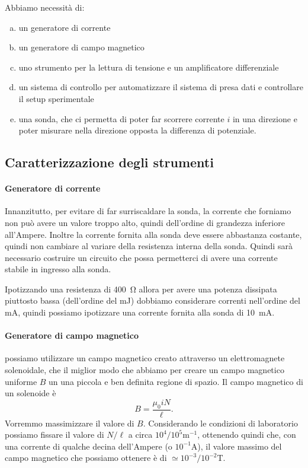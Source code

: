 \documentclass[fleqn,varvw,11pt,tightenlines]{memo}
\begin{document}
Abbiamo necessità di:\begin{enumerate}[a.]
    \item un generatore di corrente
    \item un generatore di campo magnetico
    \item uno strumento per la lettura di tensione e un amplificatore differenziale
    \item un sistema di controllo per automatizzare il sistema di presa dati e controllare il setup sperimentale
    \item una sonda, che ci permetta di poter far scorrere corrente $i$ in una direzione e poter misurare nella direzione opposta la differenza di potenziale.
\end{enumerate}

\subsection{Caratterizzazione degli strumenti}
\paragraph{Generatore di corrente} Innanzitutto, per evitare di far surriscaldare la sonda, la corrente che forniamo non può avere un valore troppo alto, quindi dell'ordine di grandezza inferiore all'Ampere. Inoltre la corrente fornita alla sonda deve essere abbastanza costante, quindi non cambiare al variare della resistenza interna della sonda. Quindi sarà necessario costruire un circuito che possa permetterci di avere una corrente stabile in ingresso alla sonda. 

Ipotizzando una resistenza di \SI{400}{\ohm} allora per avere una potenza dissipata piuttosto bassa (dell'ordine del \si{\milli\joule}) dobbiamo considerare correnti nell'ordine del \si{\milli\ampere}, quindi possiamo ipotizzare una corrente fornita alla sonda di \SI{10}{\milli\ampere}.

\paragraph{Generatore di campo magnetico} possiamo utilizzare un campo magnetico creato attraverso un elettromagnete solenoidale, che il miglior modo che abbiamo per creare un campo magnetico uniforme $B$ un una piccola e ben definita regione  di spazio. Il campo magnetico di un solenoide è \begin{equation}
    B=\frac{\mu_0iN}{\ell}. 
\end{equation} Vorremmo massimizzare il valore di $B$. Considerando le condizioni di laboratorio possiamo fissare il valore di $N/\ell$ a circa $10^4/10^5\si{\metre^{-1}}$, ottenendo quindi che, con una corrente di qualche decina dell'Ampere (o $10^{-1}\si{\ampere}$), il valore massimo del campo magnetico che possiamo ottenere è di $\simeq 10^{-3}/10^{-2}\si{\tesla}$. 
\end{document}
